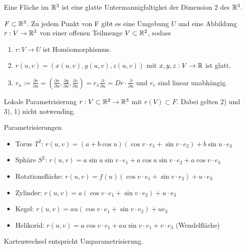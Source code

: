 \begin{defi}
    Eine Fläche im $\mathbb R^3$ ist eine glatte Untermannigfaltigkei
    der Dimension 2 des $\mathbb R^3$.
\end{defi}

\begin{bem}
    $F\subset \mathbb R^3$. Zu jedem Punkt von F gibt es eine Umgebung $U$ und eine Abbildung
    $r:V\to\mathbb R^3$ von einer offenen Teilmenge $V\subset\mathbb R^2$, sodass
    \begin{enumerate}
        \item $r:V\to U$ ist Homöomorphismus.
        \item $r(u,v) = (x(u,v),y(u,v),z(u,v))$ mit $x,y,z:V\to \mathbb R$ ist glatt.
        \item $r_u := \frac{\partial r}{\partial u} = 
        (\frac{\partial x}{\partial u},\frac{\partial y}{\partial u}, \frac{\partial z}{\partial u}) = 
        r_x\frac{\partial}{\partial u} = Dr\cdot\frac{\partial }{\partial u}$
        und $r_v$ sind linear unabhängig.
    \end{enumerate}
\end{bem}

\begin{defi}{Lokale Parametrisierung}
    $r:V\subset \mathbb R^2\to\mathbb R^3$ mit $r(V)\subset F$.
    Dabei gelten 2) und 3), 1) nicht notwending.
\end{defi}

\begin{bsp}{Parametrisierungen}
    \begin{itemize}
        \item Torus $T^2$: $r(u,v) = (a+b\cos u)(\cos v \cdot e_1 + \sin v \cdot e_2) + b\sin u \cdot e_3$
        \item Sphäre $S^2$: $r(u,v) = a\sin u \sin v \cdot e_1 + a\cos u \sin v \cdot e_2 + a\cos v \cdot e_3$
        \item Rotationsfläche: $r(u,v) = f(u)(\cos v \cdot e_1 + \sin v \cdot e_2) + u \cdot e_3$
        \item Zylinder: $r(u,v) = a(\cos v \cdot e_1 + \sin v \cdot e_2) + u \cdot e_3$
        \item Kegel: $r(u,v) = au(\cos v \cdot e_1 + \sin v \cdot e_2) + u \dot e_3$
        \item Helikorid: $r(u,v) = a \cos v \cdot e_1 + au\sin v \cdot e_1 + v\cdot e_3$ (Wendelfläche)
    \end{itemize}
\end{bsp}

\begin{bem}
    Kartenwechsel entspricht Umparametrisierung.
\end{bem}


